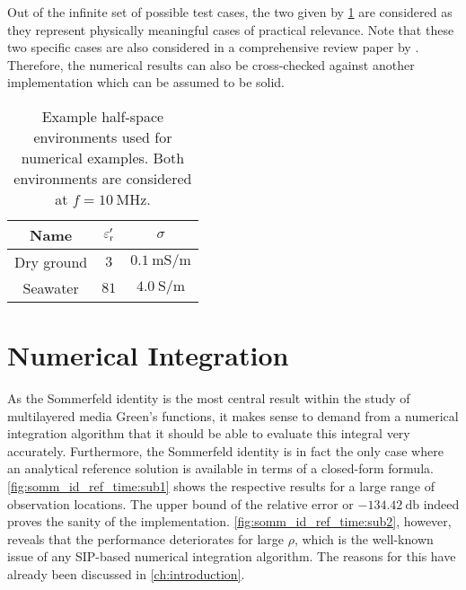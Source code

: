 Out of the infinite set of possible test cases, the two given by
\cref{tab:numerical_examples_half_spaces} are considered as they
represent physically meaningful cases of practical relevance.
Note that these two specific cases are also considered in a comprehensive
review paper by \textcite{Michalski2016b}.
Therefore, the numerical results can also be cross-checked against another
implementation which can be assumed to be solid.
\begin{table}[hbt]
	\centering
	\begin{tabular}{ccc}
		\toprule%
		Name & $\varepsilon_{\mathrm{r}}^\prime$ & $\sigma$ \\
		\midrule
		Dry ground & $\num{3}$  & $\SI{0.1}{\milli\siemens\per\metre}$ \\
		Seawater   & $\num{81}$ & $\SI{4.0}{\siemens\per\metre}$ \\
		\bottomrule
	\end{tabular}
	\caption[Example half-space environments]
	{Example half-space environments used for numerical examples.
    Both environments are considered at $f = \SI{10}{\mega\hertz}$.}
	\label{tab:numerical_examples_half_spaces}
\end{table}


\section{Numerical Integration}

As the Sommerfeld identity is the most central result within the study of
multilayered media Green's functions, it makes sense to demand from a numerical
integration algorithm that it should be able to evaluate this integral very
accurately.
Furthermore, the Sommerfeld identity is in fact the only case where an
analytical reference solution is available in terms of a closed-form formula.
\cref{fig:somm_id_ref_time:sub1} shows the respective results for a large
range of observation locations.
The upper bound of the relative error or $\SI{-134.42}{\decibel}$ indeed
proves the sanity of the implementation.
\cref{fig:somm_id_ref_time:sub2}, however, reveals that the performance
deteriorates for large $\rho$, which is the well-known issue of any
\ac{SIP}-based numerical integration algorithm.
The reasons for this have already been discussed in \cref{ch:introduction}.

